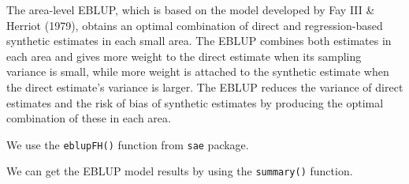 \documentclass[
]{article}
\newenvironment{Shaded}{\begin{snugshade}}{\end{snugshade}}
\newcommand{\CommentTok}[1]{\textcolor[rgb]{0.56,0.35,0.01}{\textit{#1}}}
\newcommand{\DataTypeTok}[1]{\textcolor[rgb]{0.13,0.29,0.53}{#1}}
\newcommand{\DecValTok}[1]{\textcolor[rgb]{0.00,0.00,0.81}{#1}}
\newcommand{\KeywordTok}[1]{\textcolor[rgb]{0.13,0.29,0.53}{\textbf{#1}}}
\newcommand{\NormalTok}[1]{#1}
\newcommand{\OperatorTok}[1]{\textcolor[rgb]{0.81,0.36,0.00}{\textbf{#1}}}
\newcommand{\StringTok}[1]{\textcolor[rgb]{0.31,0.60,0.02}{#1}}
\begin{document}
The area-level EBLUP, which is based on the model developed by Fay III
\& Herriot (1979), obtains an optimal combination of direct and
regression-based synthetic estimates in each small area. The EBLUP
combines both estimates in each area and gives more weight to the direct
estimate when its sampling variance is small, while more weight is
attached to the synthetic estimate when the direct estimate's variance
is larger. The EBLUP reduces the variance of direct estimates and the
risk of bias of synthetic estimates by producing the optimal combination
of these in each area.

We use the \texttt{eblupFH()} function from \texttt{sae} package.

\begin{Shaded}
\end{Shaded}

\begin{Shaded}
\end{Shaded}

We can get the EBLUP model results by using the \texttt{summary()}
function.

\begin{Shaded}
\end{Shaded}
\end{document}
